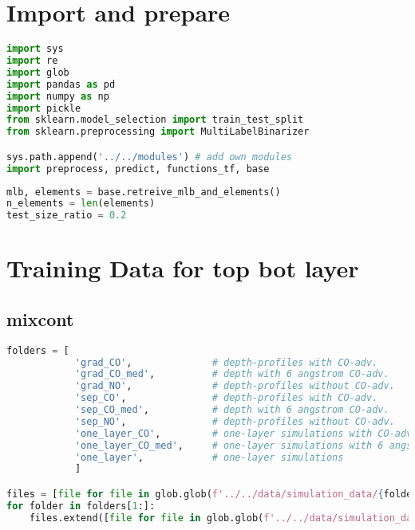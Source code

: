 \hypertarget{import-and-prepare}{%
\section{Import and prepare}\label{import-and-prepare}}

\begin{lstlisting}[language=Python]
import sys
import re
import glob
import pandas as pd
import numpy as np
import pickle
from sklearn.model_selection import train_test_split
from sklearn.preprocessing import MultiLabelBinarizer

sys.path.append('../../modules') # add own modules
import preprocess, predict, functions_tf, base
\end{lstlisting}

\begin{lstlisting}[language=Python]
mlb, elements = base.retreive_mlb_and_elements()
n_elements = len(elements)
test_size_ratio = 0.2
\end{lstlisting}

\hypertarget{training-data-for-top-bot-layer}{%
\section{Training Data for top bot
layer}\label{training-data-for-top-bot-layer}}

\hypertarget{mixcont}{%
\subsection{mixcont}\label{mixcont}}

\begin{lstlisting}[language=Python]
folders = [
            'grad_CO',              # depth-profiles with CO-adv.       with gradient layers
            'grad_CO_med',          # depth with 6 angstrom CO-adv.       with gradient layers
            'grad_NO',              # depth-profiles without CO-adv.    with gradient layers
            'sep_CO',               # depth-profiles with CO-adv.       with separated layers
            'sep_CO_med',           # depth with 6 angstrom CO-adv.       with separated layers
            'sep_NO',               # depth-profiles without CO-adv.    with separated layers
            'one_layer_CO',         # one-layer simulations with CO-adv.
            'one_layer_CO_med',     # one-layer simulations with 6 angstrom CO-adv.
            'one_layer',            # one-layer simulations
            ]

files = [file for file in glob.glob(f'../../data/simulation_data/{folders[0]}/*.spc')]
for folder in folders[1:]:
    files.extend([file for file in glob.glob(f'../../data/simulation_data/{folder}/*.spc')])
\end{lstlisting}

